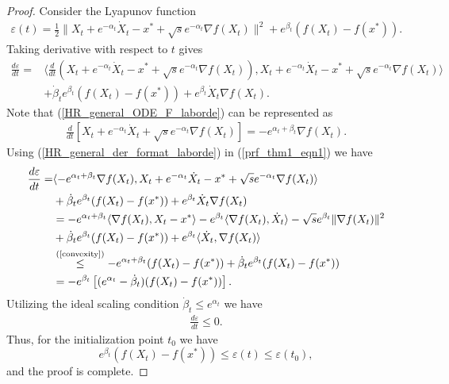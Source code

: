 \documentclass{article}
\theoremstyle{plain}
\theoremstyle{definition}
\theoremstyle{remark}
\begin{document}
\begin{proof}
Consider the Lyapunov function 
\begin{align}\label{lyap_theorem_C}
    \varepsilon(t)=\frac{1}{2}\|X_t+e^{-\alpha_t}\dot X_t-x^*+\sqrt{s}e^{-\alpha_t}\nabla f(X_t)\|^2+e^{\beta_t}(f(X_t)-f(x^*)).
\end{align}
Taking derivative with respect to $t$ gives
\begin{align}\label{prf_thm1_eqn1}
    \frac{d \varepsilon}{dt}=&\langle \frac{d}{dt}(X_t+e^{-\alpha_t}\dot X_t-x^*+\sqrt{s}e^{-\alpha_t}\nabla f(X_t)),X_t+e^{-\alpha_t}\dot X_t-x^*+\sqrt{s}e^{-\alpha_t}\nabla f(X_t)\rangle\nonumber\\
    & +\dot \beta_t e^{\beta_t}(f(X_t)-f(x^*))+e^{\beta_t}\dot X_t\nabla f(X_t).
\end{align}
Note that (\ref{HR_general_ODE_F_laborde}) can be represented as
\begin{align}\label{HR_general_der_format_laborde}
    \frac{d}{dt}\left[X_t+e^{-\alpha_t}\dot X_t+\sqrt{s}e^{-\alpha_t}\nabla f(X_t)\right]=-e^{\alpha_t+\beta_t}\nabla f(X_t).
\end{align}
Using (\ref{HR_general_der_format_laborde}) in (\ref{prf_thm1_eqn1}) we have
\begin{align}
     \frac{d \varepsilon}{dt}=& \langle -e^{\alpha_t+\beta_t}\nabla f(X_t),X_t+e^{-\alpha_t}\dot X_t-x^*+\sqrt{s}e^{-\alpha_t}\nabla f(X_t) \rangle \nonumber \\
     &+\dot \beta_t e^{\beta_t}(f(X_t)-f(x^*))+e^{\beta_t}\dot X_t\nabla f(X_t)\nonumber\\
     &= -e^{\alpha_t+\beta_t}\langle\nabla f(X_t),X_t-x^*\rangle -e^{\beta_t}\langle \nabla f(X_t),\dot X_t\rangle -\sqrt{s}e^{\beta_t}\|\nabla f(X_t)\|^2\nonumber\\
     &+\dot \beta_te^{\beta_t}(f(X_t)-f(x^*))+e^{\beta_t}\langle \dot X_t,\nabla f(X_t) \rangle\nonumber\\
     & \overset{\text{(\ref{convexity}})}{\leq} -e^{\alpha_t+\beta_t}(f(X_t)-f(x^*))+\dot \beta_te^{\beta_t}(f(X_t)-f(x^*))\nonumber\\
     & = -e^{\beta_t}\left[(e^{\alpha_t}-\dot \beta_t)(f(X_t)-f(x^*))\right].\nonumber
\end{align}
Utilizing the ideal scaling condition $\dot \beta_t\leq e^{\alpha_t}$ we have
\begin{align}
     \frac{d \varepsilon}{dt}\leq 0.\nonumber
\end{align}
Thus, for the initialization point $t_0$ we have
$$e^{\beta_t}(f(X_t)-f(x^*))\leq \varepsilon(t)\leq \varepsilon(t_0),$$
and the proof is complete.
\end{proof}
\end{document}
